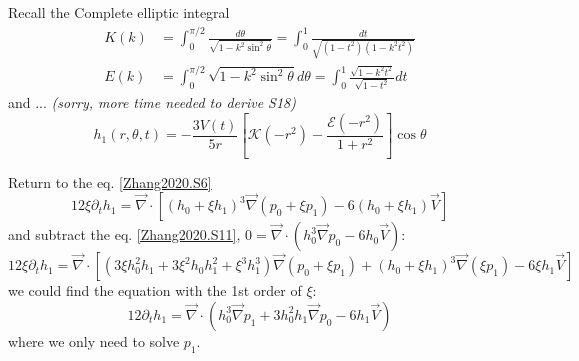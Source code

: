 \documentclass[books,12pt]{elegantpaper}
\begin{document}
Recall the Complete elliptic integral
$$ \begin{align}
K(k) &= \int_0^{\pi/2} \frac{d\theta}{\sqrt{1-k^2\sin^2\theta}} = \int_0^1 \frac{dt}{\sqrt{(1-t^2)(1-k^2t^2)}} \\
E(k) &= \int_0^{\pi/2} \sqrt{1-k^2\sin^2\theta} d\theta = \int_0^1 \frac{\sqrt{1-k^2t^2}}{\sqrt{1-t^2}} dt
\end{align} $$
and ... \textit{(sorry, more time needed to derive S18)}
\begin{equation} h_1 (r,\theta,t) = - \frac{3V(t)}{5r} \left[ \mathcal{K} (-r^2) - \frac{\mathcal{E} (-r^2)}{1+r^2} \right] \cos\theta \tag{Zhang2020.S18} \label{Zhang2020.S18} \end{equation}

Return to the eq. \ref{Zhang2020.S6} 
$$ 12 \xi \partial_t h_1 = \vec\nabla \cdot \left[ (h_0 + \xi h_1)^3 \vec\nabla (p_0 + \xi p_1) - 6(h_0 + \xi h_1) \vec{V} \right] $$
and subtract the eq. \ref{Zhang2020.S11}, $0 = \vec\nabla \cdot \left( h_0^3 \vec\nabla p_0 - 6 h_0 \vec{V} \right)$:
$$ 12 \xi \partial_t h_1 = \vec\nabla \cdot \left[ (3 \xi h_0^2 h_1 + 3\xi^2 h_0 h_1^2 + \xi^3 h_1^3) \vec\nabla(p_0 + \xi p_1) + (h_0 + \xi h_1)^3 \vec\nabla (\xi p_1) - 6 \xi h_1 \vec{V} \right] $$
we could find the equation with the 1st order of $\xi$:
\begin{equation} 12 \partial_t h_1 = \vec\nabla \cdot \left( h_0^3 \vec\nabla p_1 + 3h_0^2 h_1 \vec\nabla p_0 - 6h_1 \vec{V} \right) \tag{Zhang2020.S19} \end{equation}
where we only need to solve $p_1$.
\end{document}
